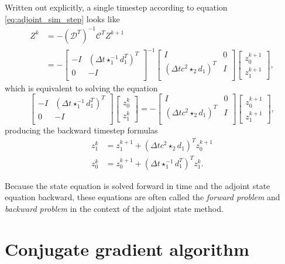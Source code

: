 \documentclass[utf8,english]{gradu3}
\begin{document}
Written out explicitly, a single timestep
according to equation \eqref{eq:adjoint_sim_step} looks like
\begin{align*}
  Z^k &= -(\mathcal{D}^T)^{-1} \mathcal{C}^T Z^{k+1} \\
  &= -\begin{bmatrix}
    -I & (\Delta t \star_1^{-1} d_1^T)^T \\
    0 & -I \\
  \end{bmatrix}^{-1}
  \begin{bmatrix}
    I & 0 \\
    (\Delta t c^2 \star_2 d_1)^T & I \\
  \end{bmatrix}
  \begin{bmatrix}
    z_0^{k+1} \\ z_1^{k+1}
  \end{bmatrix},
\end{align*}
which is equivalent to solving the equation
\[
  \begin{bmatrix}
    -I & (\Delta t \star_1^{-1} d_1^T)^T \\
    0 & -I \\
  \end{bmatrix}
  \begin{bmatrix}
    z_0^k \\ z_1^k
  \end{bmatrix}
  = -\begin{bmatrix}
    I & 0 \\
    (\Delta t c^2 \star_2 d_1)^T & I \\
  \end{bmatrix}
  \begin{bmatrix}
    z_0^{k+1} \\ z_1^{k+1}
  \end{bmatrix},
\]
producing the backward timestep formulas
\begin{align}
z_1^k &= z_1^{k+1} + (\Delta t c^2 \star_2 d_1)^T z_0^{k+1} \\
z_0^k &= z_0^{k+1} + (\Delta t \star_1^{-1} d_1^T)^T z_1^k.
\end{align}

Because the state equation is solved forward in time
and the adjoint state equation backward,
these equations are often called
the \textit{forward problem} and \textit{backward problem}
in the context of the adjoint state method.


\section{Conjugate gradient algorithm}
\end{document}
